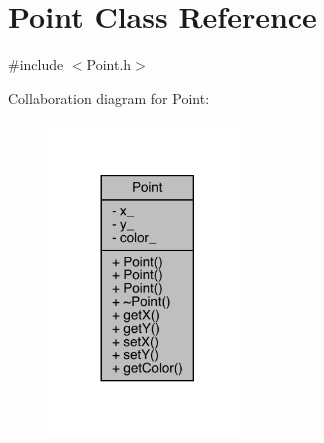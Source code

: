\hypertarget{class_point}{}\section{Point Class Reference}
\label{class_point}


{\ttfamily \#include $<$Point.\+h$>$}



Collaboration diagram for Point\+:\nopagebreak
\begin{figure}[H]
\begin{center}
\leavevmode
\includegraphics[width=149pt]{class_point__coll__graph}
\end{center}
\end{figure}
